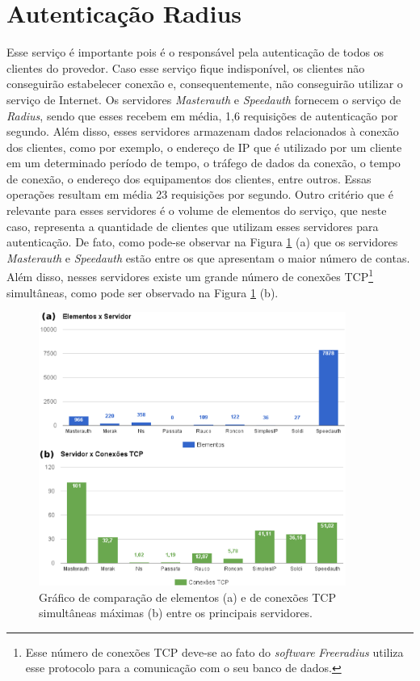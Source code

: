 \section{Autenticação Radius}
\label{section:radius}

Esse serviço é importante pois é o responsável pela autenticação de todos os clientes do provedor. Caso esse serviço fique indisponível, 
os clientes não conseguirão estabelecer conexão e, consequentemente, não conseguirão utilizar o serviço de Internet. Os servidores 
\textit{Masterauth} e \textit{Speedauth} fornecem o serviço de \textit{Radius}, sendo que esses recebem em média, 1,6 requisições de autenticação 
por segundo. Além disso, esses servidores armazenam dados relacionados à conexão dos clientes, como por exemplo, o endereço de \ac{IP} que é 
utilizado por um cliente em um determinado período de tempo, o tráfego de dados da conexão, o tempo de conexão, o endereço  dos 
equipamentos dos clientes, entre outros. Essas operações resultam em média 23 requisições por segundo. 
Outro critério que é relevante para esses servidores é o volume de elementos do serviço, que neste caso, representa a quantidade de clientes que
utilizam esses servidores para autenticação. De fato, como pode-se observar na Figura \ref{fig:elementos_tcp} (a) que os servidores 
\textit{Masterauth} e \textit{Speedauth} estão entre os que apresentam o maior número de contas. Além disso, nesses servidores existe um grande 
número de conexões \ac{TCP}\footnote[1]{Esse número de conexões \ac{TCP} deve-se ao fato do \textit{software} \textit{Freeradius} utiliza esse 
protocolo para a comunicação com o seu banco de dados.} simultâneas, como pode ser observado na Figura \ref{fig:elementos_tcp} (b).


\begin{figure}[h!]
 \centering
 \includegraphics[width=380px]{img/elementos_tcp.eps}
 \caption{Gráfico de comparação de elementos (a) e de conexões TCP simultâneas máximas (b) entre os principais servidores.}
 \label{fig:elementos_tcp}
\end{figure}

